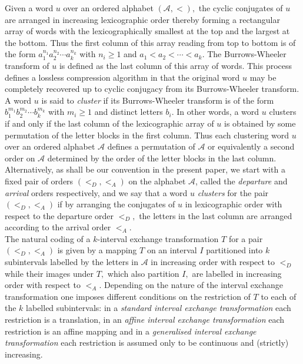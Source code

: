 \documentclass[12pt,a4paper]{amsart}
\begin{document}
Given a word $u$ over an ordered  alphabet $(\mathcal A, <),$  the cyclic conjugates of $u$ are arranged in increasing lexicographic order thereby forming a rectangular array of words with the lexicographically  smallest at the  top and the  largest at the bottom. Thus the first column of this array reading from top to bottom is of the form $a_1^{n_1}a_2^{n_2}\cdots a_k^{n_k}$ with $n_i\geq 1$  and  $a_1<a_2 <\cdots < a_k.$  The Burrows-Wheeler transform of $u$ is defined as the last column of this array of words. This process defines a  lossless compression algorithm in that the original word $u$ may be completely recovered up to cyclic conjugacy from its Burrows-Wheeler transform.    A word $u$ is said to {\it cluster} if its Burrows-Wheeler transform  is of the form $b_1^{m_1}b_2^{m_2}\cdots b_k^{m_k}$ with $m_i\geq 1$ and  distinct letters $b_i.$     In other words, a word $u$ clusters if and only if the last column of the lexicographic array of $u$ is obtained by some permutation of the letter blocks in the first column. Thus each clustering word $u$ over an ordered alphabet $\mathcal A$ defines a permutation of $\mathcal A$  or equivalently a second order  on $\mathcal A$ determined by the order of the letter blocks in the last column.  Alternatively, as shall be our convention in the present paper, we  start with a fixed pair of orders
$(<_D, <_A)$ on the alphabet $\mathcal A $, called the {\it departure} and  {\it arrival} orders respectively, and we say that a word $u$ {\it clusters} for the pair  $(<_D, <_A)$ if by arranging the conjugates of $u$ in lexicographic order with respect to the departure order $<_D,$ the letters in the last column are arranged according to the arrival order $<_A.$ \\

The natural coding of a $k$-interval exchange transformation $T$  for  a pair  $(<_D, <_A)$  is given by a mapping $T$ on an interval $I$ partitioned into $k$ subintervals labelled by the letters in $\mathcal A$ in increasing order with respect to $<_D$   while their images  under $T,$ which also partition $I,$ are labelled in increasing order with respect to  $<_A.$ Depending on the nature of the interval exchange transformation one imposes different conditions on the restriction of $T$ to each of the $k$ labelled subintervals: in a {\it standard interval exchange transformation} each restriction is  a translation, in an {\it affine  interval exchange transformation} each  restriction is  an affine mapping and in a {\it generalised interval exchange transformation} each restriction is  assumed only to be continuous and (strictly) increasing. 
\end{document}
